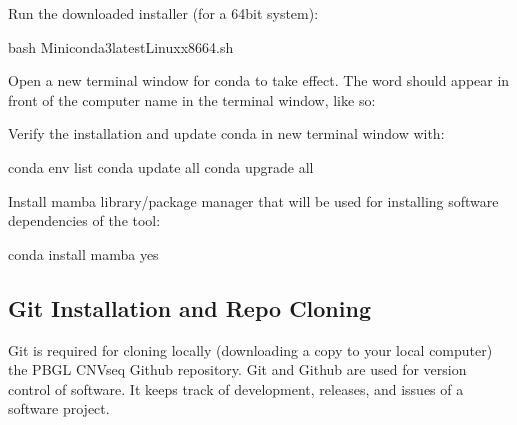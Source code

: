 \documentclass[letterpaper,10pt,english]{sphinxhowto}
\begin{document}
\sphinxAtStartPar
Run the downloaded installer (for a 64\sphinxhyphen{}bit system):

\begin{sphinxVerbatim}[commandchars=\\\{\}]
\PYGZdl{} bash Miniconda3\PYGZhy{}latest\PYGZhy{}Linux\PYGZhy{}x86\PYGZus{}64.sh
\end{sphinxVerbatim}

\sphinxAtStartPar
Open a new terminal window for conda to take effect. The word  should appear in front of the computer name in the terminal window, like so:

\begin{figure}[htbp]
\centering

\noindent{}
\end{figure}

\begin{figure}[htbp]
\centering

\noindent{}
\end{figure}

\sphinxAtStartPar
Verify the installation and update conda in new terminal window with:

\begin{sphinxVerbatim}[commandchars=\\\{\}]
\PYGZdl{} conda env list
\PYGZdl{} conda update \PYGZhy{}\PYGZhy{}all
\PYGZdl{} conda upgrade \PYGZhy{}\PYGZhy{}all
\end{sphinxVerbatim}

\sphinxAtStartPar
Install mamba library/package manager that will be used for installing software dependencies of the tool:

\begin{sphinxVerbatim}[commandchars=\\\{\}]
\PYGZdl{} conda install mamba \PYGZhy{}\PYGZhy{}yes
\end{sphinxVerbatim}


\subsection{Git Installation and Repo Cloning}
\label{\detokenize{index:git-installation-and-repo-cloning}}
\sphinxAtStartPar
Git is required for cloning locally (downloading a copy to your local computer) the PBGL CNVseq Github repository. Git and Github are used for version control of software. It keeps track of development, releases, and issues of a software project.
\end{document}
